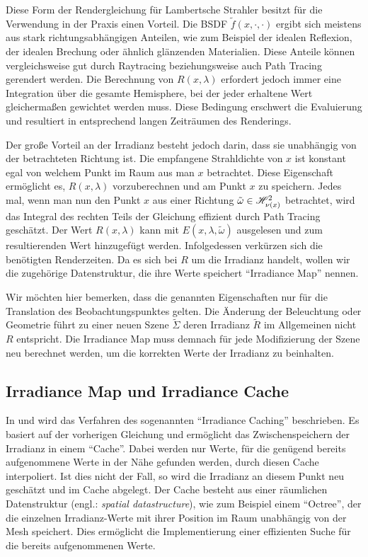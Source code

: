 		Diese Form der Rendergleichung für Lambertsche Strahler besitzt für die Verwendung in der Praxis einen Vorteil.
		Die BSDF $\tilde{f}(x,\cdot,\cdot)$ ergibt sich meistens aus stark richtungsabhängigen Anteilen, wie zum Beispiel der idealen Reflexion, der idealen Brechung oder ähnlich glänzenden Materialien.
		Diese Anteile können vergleichsweise gut durch Raytracing beziehungsweise auch Path Tracing gerendert werden.
		Die Berechnung von $R(x,\lambda)$ erfordert jedoch immer eine Integration über die gesamte Hemisphere, bei der jeder erhaltene Wert gleichermaßen gewichtet werden muss.
		Diese Bedingung erschwert die Evaluierung und resultiert in entsprechend langen Zeiträumen des Renderings.

		Der große Vorteil an der Irradianz besteht jedoch darin, dass sie unabhängig von der betrachteten Richtung ist.
		Die empfangene Strahldichte von $x$ ist konstant egal von welchem Punkt im Raum aus man $x$ betrachtet.
		Diese Eigenschaft ermöglicht es, $R(x,\lambda)$ vorzuberechnen und am Punkt $x$ zu speichern.
		Jedes mal, wenn man nun den Punkt $x$ aus einer Richtung $\tilde{\omega}\in\mathscr{H}^{2}_{\nu(x)}$ betrachtet, wird das Integral des rechten Teils der Gleichung effizient durch Path Tracing geschätzt. Der Wert $R(x,\lambda)$ kann mit $E(x,\lambda,\tilde{\omega})$ ausgelesen und zum resultierenden Wert hinzugefügt werden.
		Infolgedessen verkürzen sich die benötigten Renderzeiten.
		Da es sich bei $R$ um die Irradianz handelt, wollen wir die zugehörige Datenstruktur, die ihre Werte speichert \enquote{Irradiance Map} nennen.

		Wir möchten hier bemerken, dass die genannten Eigenschaften nur für die Translation des Beobachtungspunktes gelten.
		Die Änderung der Beleuchtung oder Geometrie führt zu einer neuen Szene $\tilde{\Sigma}$ deren Irradianz $\tilde{R}$ im Allgemeinen nicht $R$ entspricht.
		Die Irradiance Map muss demnach für jede Modifizierung der Szene neu berechnet werden, um die korrekten Werte der Irradianz zu beinhalten.


	\subsection{Irradiance Map und Irradiance Cache} %
	\label{sub:irradiance_map_und_irradiance_cache}

		In \cite{irradiance-caching} und \cite[S.~783~ff]{pbrt2} wird das Verfahren des sogenannten \enquote{Irradiance Caching} beschrieben.
		Es basiert auf der vorherigen Gleichung und ermöglicht das Zwischenspeichern der Irradianz in einem \enquote{Cache}.
		Dabei werden nur Werte, für die genügend bereits aufgenommene Werte in der Nähe gefunden werden, durch diesen Cache interpoliert.
		Ist dies nicht der Fall, so wird die Irradianz an diesem Punkt neu geschätzt und im Cache abgelegt.
		Der Cache besteht aus einer räumlichen Datenstruktur (engl.: \textit{spatial datastructure}), wie zum Beispiel einem \enquote{Octree}, der die einzelnen Irradianz-Werte mit ihrer Position im Raum unabhängig von der Mesh speichert.
		Dies ermöglicht die Implementierung einer effizienten Suche für die bereits aufgenommenen Werte.

